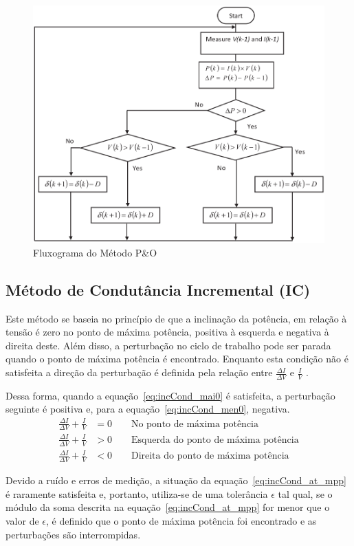\documentclass[
	12pt,				%
	openright,			%
	onseside,
	a4paper,			%
	english,			%
	french,				%
	spanish,			%
	brazil,				%
	]{abntex2}
\begin{document}
\begin{figure}[htbp]
	\begin{center}
		\includegraphics[width=0.55 \linewidth]{peo_flow}
		\caption{Fluxograma do Método P\&O \cite{Talha_MPPT}}
		\label{fig:PeO_Flux}
	\end{center}
\end{figure}

\subsection{Método de Condutância Incremental (IC)}

Este método se baseia no princípio de que a inclinação da potência, em relação à tensão é zero no ponto de máxima potência, positiva à esquerda e negativa à direita deste. Além disso, a perturbação no ciclo de trabalho pode ser parada quando o ponto de máxima potência é encontrado. Enquanto esta condição não é satisfeita a direção da perturbação é definida pela relação entre $\frac{\Delta I}{\Delta V}$ e $\frac{I}{V}$ \cite{Talha_MPPT}\cite{MPPT_P&O_IC}.

Dessa forma, quando a equação~\ref{eq:incCond_mai0} é satisfeita, a perturbação seguinte é positiva e, para a equação~\ref{eq:incCond_men0}, negativa.
\begin{align}%
	\frac{\Delta I}{\Delta V} + \frac{I}{V} &= 0 \qquad \text{No ponto de máxima potência} \label{eq:incCond_at_mpp}\\
	\frac{\Delta I}{\Delta V} + \frac{I}{V} &> 0 \qquad \text{Esquerda do ponto de máxima potência} \label{eq:incCond_mai0}\\
	\frac{\Delta I}{\Delta V} + \frac{I}{V} &< 0 \qquad \text{Direita do ponto de máxima potência} \label{eq:incCond_men0}
\end{align}

Devido a ruído e erros de medição, a situação da equação~\ref{eq:incCond_at_mpp} é raramente satisfeita e, portanto, utiliza-se de uma tolerância $\epsilon$ tal qual, se o módulo da soma descrita na equação~\ref{eq:incCond_at_mpp} for menor que o valor de $\epsilon$, é definido que o ponto de máxima potência foi encontrado e as perturbações são interrompidas\cite{Talha_MPPT}.
\end{document}
